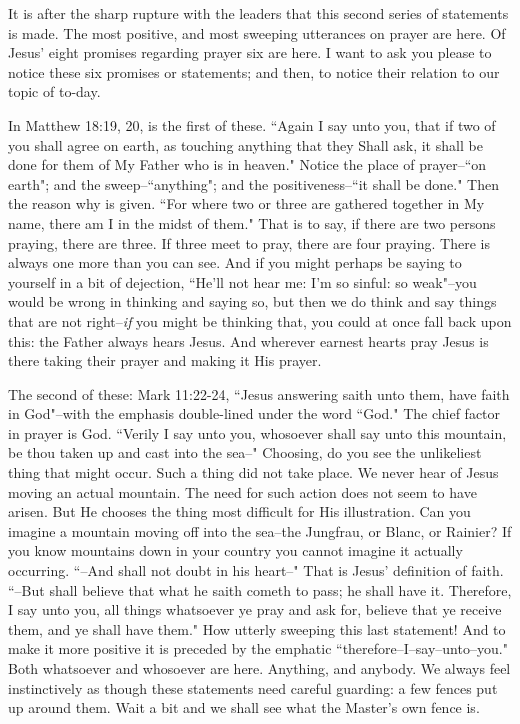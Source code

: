 It is after the sharp rupture with the leaders that this second series of
statements is made. The most positive, and most sweeping utterances on
prayer are here. Of Jesus' eight promises regarding prayer six are here. I
want to ask you please to notice these six promises or statements; and
then, to notice their relation to our topic of to-day.

In Matthew 18:19, 20, is the first of these. ``Again I say unto you, that
if two of you shall agree on earth, as touching anything that they Shall
ask, it shall be done for them of My Father who is in heaven." Notice the
place of prayer--``on earth"; and the sweep--``anything"; and the
positiveness--``it shall be done." Then the reason why is given. ``For where
two or three are gathered together in My name, there am I in the midst of
them." That is to say, if there are two persons praying, there are three.
If three meet to pray, there are four praying. There is always one more
than you can see. And if you might perhaps be saying to yourself in a bit
of dejection, ``He'll not hear me: I'm so sinful: so weak"--you would be
wrong in thinking and saying so, but then we do think and say things that
are not right--\textit{if} you might be thinking that, you could at once fall
back upon this: the Father always hears Jesus. And wherever earnest hearts
pray Jesus is there taking their prayer and making it His prayer.

The second of these: Mark 11:22-24, ``Jesus answering saith unto them, have
faith in God"--with the emphasis double-lined under the word ``God." The
chief factor in prayer is God. ``Verily I say unto you, whosoever shall say
unto this mountain, be thou taken up and cast into the sea--" Choosing, do
you see the unlikeliest thing that might occur. Such a thing did not take
place. We never hear of Jesus moving an actual mountain. The need for such
action does not seem to have arisen. But He chooses the thing most
difficult for His illustration. Can you imagine a mountain moving off into
the sea--the Jungfrau, or Blanc, or Rainier? If you know mountains down in
your country you cannot imagine it actually occurring. ``--And shall not
doubt in his heart--" That is Jesus' definition of faith. ``--But shall
believe that what he saith cometh to pass; he shall have it. Therefore, I
say unto you, all things whatsoever ye pray and ask for, believe that ye
receive them, and ye shall have them." How utterly sweeping this last
statement! And to make it more positive it is preceded by the emphatic
``therefore--I--say--unto--you." Both whatsoever and whosoever are here.
Anything, and anybody. We always feel instinctively as though these
statements need careful guarding: a few fences put up around them. Wait a
bit and we shall see what the Master's own fence is.


